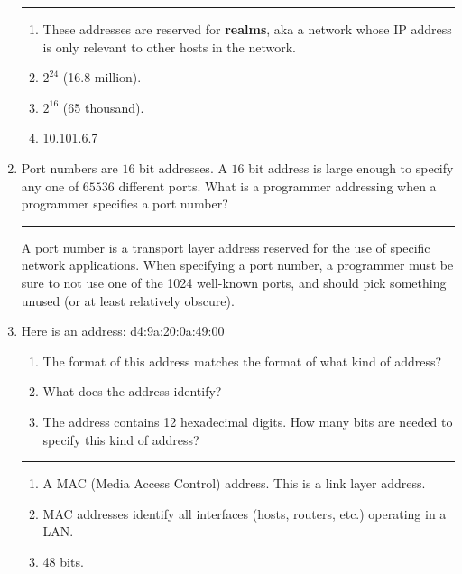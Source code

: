 \documentclass[twoside]{article}
\newenvironment{answer}
  {\vspace*{0.2cm} \rule{12cm}{0.04cm} \vspace*{0.2cm}}
  {\vspace*{0.2cm}}
\begin{document}
\begin{enumerate}
  \begin{answer}

  \begin{enumerate}
    \item These addresses are reserved for \textbf{realms}, aka a network whose IP address is only relevant to other hosts in the network.
    \item $2^24$ (16.8 million).
    \item $2^16$ (65 thousand).
    \item 10.101.6.7
    \end{enumerate}

    \end{answer}

  \item Port numbers are $16$ bit addresses. A $16$ bit address is large
    enough to specify any one of $65536$ different ports. What is a programmer
    addressing when a programmer specifies a port number?

  \begin{answer}
    A port number is a transport layer address reserved for the use of specific network applications. When specifying
	a port number, a programmer must be sure to not use one of the 1024 well-known ports, and should pick something unused
	(or at least relatively obscure).
    \end{answer}

  \item Here is an address: d4:9a:20:0a:49:00
  \begin{enumerate}
    \item The format of this address matches the format of what kind of address?
    \item What does the address identify?
    \item The address contains 12 hexadecimal digits. How many bits are needed
      to specify this kind of address?
    \end{enumerate}
  
  \begin{answer}

  \begin{enumerate}
    \item A MAC (Media Access Control) address. This is a link layer address.
    \item MAC addresses identify all interfaces (hosts, routers, etc.) operating in a LAN.
    \item 48 bits.
    \end{enumerate}


\end{answer}
\end{enumerate}
\end{document}
